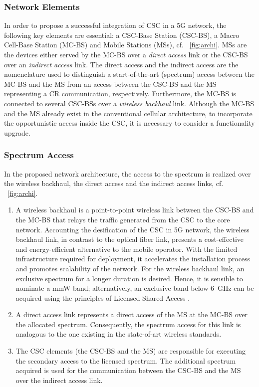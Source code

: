 \subsubsection*{Network Elements}
 In order to propose a successful integration of CSC in a 5G network, the following key elements are essential: a CSC-Base Station (CSC-BS), a Macro Cell-Base Station (MC-BS) and Mobile Stations (MSs), cf. \figurename~\ref{fig:archi}. MSs are the devices either served by the MC-BS over a \textit{direct access} link or the CSC-BS over an \textit{indirect access} link. The direct access and the indirect access are the nomenclature used to distinguish a start-of-the-art (spectrum) access between the MC-BS and the MS from an access between the CSC-BS and the MS representing a CR communication, respectively. Furthermore, the MC-BS is connected to several CSC-BSs over a \textit{wireless backhaul} link. Although the MC-BS and the MS already exist in the conventional cellular architecture, to incorporate the opportunistic access inside the CSC, it is necessary to consider a functionality upgrade.

\subsubsection*{Spectrum Access}
In the proposed network architecture, the access to the spectrum is realized over the wireless backhaul, the direct access and the indirect access links, cf. \figurename~\ref{fig:archi}.
\begin{enumerate}
\item A wireless backhaul is a
point-to-point wireless link between the CSC-BS and the MC-BS that relays the traffic generated from the CSC to the core network. Accounting the desification of the CSC in 5G network, the wireless backhaul link, in contrast to the optical fiber link, presents a cost-effective and energy-efficient alternative to the mobile operator.
With the limited infrastructure required for deployment, it accelerates the installation process and promotes scalability of the network.
For the wireless backhaul link, an exclusive spectrum for a longer duration is desired. Hence, it is sensible to nominate a mmW band; alternatively, an exclusive band below \SI{6}{GHz} can be acquired using the principles of Licensed Shared Access \cite{ETSI13}.

\item A direct access link represents a direct access of the MS at the MC-BS over the allocated spectrum. Consequently, the spectrum access for this link is analogous to the one existing in the state-of-art wireless standards.
\item The CSC elements (the CSC-BS and the MS) are responsible for executing the secondary access to the licensed spectrum. The additional spectrum acquired is used for the communication between the CSC-BS and the MS over the indirect access link.
\end{enumerate}

